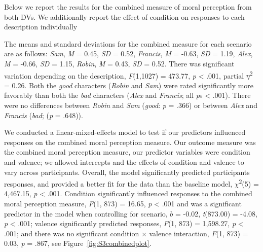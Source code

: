 \documentclass[
  american,
  man,mask,floatsintext]{apa6}
\begin{document}
Below we report the results for the combined measure of moral perception from both DVs. We additionally report the effect of condition on responses to each description individually

The means and standard deviations for the combined measure for each scenario are as follows:
\emph{Sam},
\emph{M} = 0.45, \emph{SD} = 0.52,
\emph{Francis},
\emph{M} = -0.63, \emph{SD} = 1.19,
\emph{Alex},
\emph{M} = -0.66, \emph{SD} = 1.15,
\emph{Robin},
\emph{M} = 0.43, \emph{SD} = 0.52. There was significant variation depending on the description, \emph{F}(1,1027) = 473.77, \emph{p} \textless{} .001, partial \(\eta\)\textsuperscript{2} = 0.26. Both the \emph{good} characters (\emph{Robin} and \emph{Sam}) were rated significantly more favorably than both the \emph{bad} characters (\emph{Alex} and \emph{Francis}; all \emph{p}s \textless{} .001). There were no differences between \emph{Robin} and \emph{Sam} (\emph{good}: \emph{p} = .366) or between \emph{Alex} and \emph{Francis} (\emph{bad}; (\emph{p} = .648)).

We conducted a linear-mixed-effects model to test if our predictors influenced responses on the combined moral perception measure. Our outcome measure was the combined moral perception measure, our predictor variables were condition and valence; we allowed intercepts and the effects of condition and valence to vary across participants.
Overall, the model significantly predicted participants responses, and provided a better fit for the data than the baseline model,
\(\chi\)\textsuperscript{2}(5) = 4,467.15, \emph{p} \textless{} .001.
Condition significantly influenced responses to the combined moral perception measure,
\emph{F}(1, 873) = 16.65, \emph{p} \textless{} .001
and was a significant predictor in the model when controlling for scenario, \(b\) = -0.02, \emph{t}(873.00) = -4.08, \emph{p} \textless{} .001;
valence significantly predicted responses,
\emph{F}(1, 873) = 1,598.27, \emph{p} \textless{} .001;
and there was no significant condition \(\times\) valence interaction,
\emph{F}(1, 873) = 0.03, \emph{p} = .867, see Figure~\ref{fig:S3combinedplot}.
\end{document}
